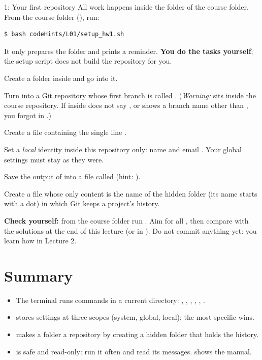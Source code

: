 \begin{homework}{1: Your first repository}
All work happens inside the  folder of the course folder. From the course folder (), run:
\begin{lstlisting}
$ bash codeHints/L01/setup_hw1.sh
\end{lstlisting}
It only prepares the  folder and prints a reminder. \textbf{You do the tasks yourself}; the setup script does not build the repository for you.

\begin{description}[leftmargin=1.2em,style=nextline]
\item[1.1 Folder] Create a folder  inside  and go into it.
\item[1.2 Repository] Turn  into a Git repository whose first branch is called . (\emph{Warning:}  sits inside the course repository. If  inside  does not say , or shows a branch name other than , you forgot  in .)
\item[1.3 A file] Create a file  containing the single line .
\item[1.4 Local identity] Set a \emph{local} identity inside this repository only: name  and email . Your global settings must stay as they were.
\item[1.5 Status] Save the output of  into a file called  (hint: ).
\item[1.6 Question] Create a file  whose only content is the name of the hidden folder (its name starts with a dot) in which Git keeps a project's history.
\end{description}

\textbf{Check yourself:} from the course folder run . Aim for all , then compare with the solutions at the end of this lecture (or in ). Do not commit anything yet: you learn how in Lecture 2.
\end{homework}

\section{Summary}

\begin{itemize}
  \item The terminal runs commands in a current directory: , , , , , .
  \item {} stores settings at three scopes (system, global, local); the most specific wins.
  \item {} makes a folder a repository by creating a hidden  folder that holds the history.
  \item {} is safe and read-only: run it often and read its messages.  shows the manual.
\end{itemize}

